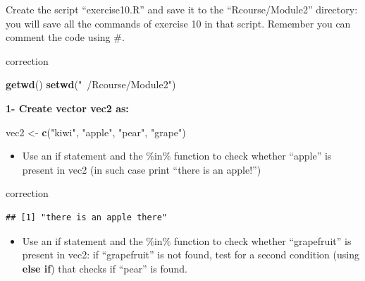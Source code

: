 \documentclass[]{book}
\newenvironment{Shaded}{\begin{snugshade}}{\end{snugshade}}
\newcommand{\ControlFlowTok}[1]{\textcolor[rgb]{0.13,0.29,0.53}{\textbf{#1}}}
\newcommand{\KeywordTok}[1]{\textcolor[rgb]{0.13,0.29,0.53}{\textbf{#1}}}
\newcommand{\NormalTok}[1]{#1}
\newcommand{\OperatorTok}[1]{\textcolor[rgb]{0.81,0.36,0.00}{\textbf{#1}}}
\newcommand{\StringTok}[1]{\textcolor[rgb]{0.31,0.60,0.02}{#1}}
\providecommand{\tightlist}{%
  \setlength{\itemsep}{0pt}\setlength{\parskip}{0pt}}
\begin{document}
Create the script ``exercise10.R'' and save it to the ``Rcourse/Module2'' directory: you will save all the commands of exercise 10 in that script.
Remember you can comment the code using \#.

correction

\begin{Shaded}
\begin{Highlighting}[]
\KeywordTok{getwd}\NormalTok{()}
\KeywordTok{setwd}\NormalTok{(}\StringTok{"~/Rcourse/Module2"}\NormalTok{)}
\end{Highlighting}
\end{Shaded}

\textbf{1- Create vector vec2 as:}

\begin{Shaded}
\begin{Highlighting}[]
\NormalTok{vec2 <-}\StringTok{ }\KeywordTok{c}\NormalTok{(}\StringTok{"kiwi"}\NormalTok{, }\StringTok{"apple"}\NormalTok{, }\StringTok{"pear"}\NormalTok{, }\StringTok{"grape"}\NormalTok{)}
\end{Highlighting}
\end{Shaded}

\begin{itemize}
\tightlist
\item
  Use an if statement and the \%in\% function to check whether ``apple'' is present in vec2 (in such case print ``there is an apple!'')
\end{itemize}

correction

\begin{Shaded}
\end{Shaded}

\begin{verbatim}
## [1] "there is an apple there"
\end{verbatim}

\begin{itemize}
\tightlist
\item
  Use an if statement and the \%in\% function to check whether ``grapefruit'' is present in vec2: if ``grapefruit'' is not found, test for a second condition (using \textbf{else if}) that checks if ``pear'' is found.
\end{itemize}
\end{document}
